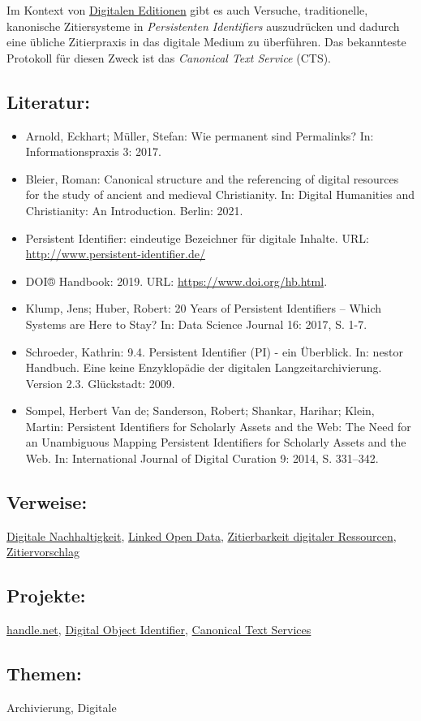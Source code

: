 \documentclass{article}
\begin{document}
        Im Kontext von \href{http://gams.uni-graz.at/o:konde.59}{Digitalen Editionen} gibt es auch Versuche, traditionelle, kanonische Zitiersysteme in \emph{Persistenten Identifiers} auszudrücken und dadurch eine übliche Zitierpraxis in das digitale Medium zu überführen. Das bekannteste Protokoll für diesen Zweck ist das \emph{Canonical Text Service} (CTS). \\
            
        \subsection*{Literatur:}\begin{itemize}\item Arnold, Eckhart; Müller, Stefan: Wie permanent sind Permalinks? In: Informationspraxis 3: 2017.\item Bleier, Roman: Canonical structure and the referencing of digital resources for the study of ancient and medieval Christianity. In: Digital Humanities and Christianity: An Introduction. Berlin: 2021.\item Persistent Identifier: eindeutige Bezeichner für digitale Inhalte. URL: \url{http://www.persistent-identifier.de/}\item DOI® Handbook: 2019. URL: \url{https://www.doi.org/hb.html}.\item Klump, Jens; Huber, Robert: 20 Years of Persistent Identifiers – Which Systems are Here to Stay? In: Data Science Journal 16: 2017, S. 1-7.\item Schroeder, Kathrin: 9.4. Persistent Identifier (PI) - ein Überblick. In: nestor Handbuch. Eine keine Enzyklopädie der digitalen Langzeitarchivierung. Version 2.3. Glückstadt: 2009.\item Sompel, Herbert Van de; Sanderson, Robert; Shankar, Harihar; Klein, Martin: Persistent Identifiers for Scholarly Assets and the Web: The Need for an Unambiguous Mapping Persistent Identifiers for Scholarly Assets and the Web. In: International Journal of Digital Curation 9: 2014, S. 331–342.\end{itemize}\subsection*{Verweise:}\href{https://gams.uni-graz.at/o:konde.6}{Digitale Nachhaltigkeit}, \href{https://gams.uni-graz.at/o:konde.8}{Linked Open Data}, \href{https://gams.uni-graz.at/o:konde.219}{Zitierbarkeit digitaler Ressourcen}, \href{https://gams.uni-graz.at/o:konde.220}{Zitiervorschlag}\subsection*{Projekte:}\href{http://handle.net}{handle.net}, \href{https://www.doi.org}{Digital Object Identifier}, \href{http://cite-architecture.github.io/cts_spec/specification.html#cts}{Canonical Text Services}\subsection*{Themen:}Archivierung, Digitale 
\end{document}
